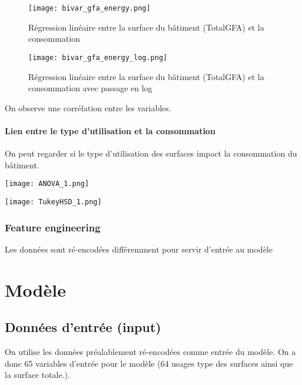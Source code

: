\begin{figure}[H]
  \texttt{[image: bivar\_gfa\_energy.png]}
  \caption{Régression linéaire entre la surface du bâtiment (TotalGFA) et la
  consommation}
  \label{}
\end{figure}

\begin{figure}[H]
  \texttt{[image: bivar\_gfa\_energy\_log.png]}
  \caption{Régression linéaire entre la surface du bâtiment (TotalGFA) et la
  consommation avec passage en log}
  \label{}
\end{figure}

On observe une corrélation entre les variables.



\paragraph{Lien entre le type d'utilisation et la consommation}
On peut regarder si le type d'utilisation des surfaces impact la consommation du bâtiment.
\begin{figure*}
  \texttt{[image: ANOVA\_1.png]}
  \caption{}
  \label{}
\end{figure*}
\begin{figure*}
  \texttt{[image: TukeyHSD\_1.png]}
  \caption{}
  \label{}
\end{figure*}




\subsubsection{Feature engineering}

Les données sont ré-encodées différemment pour servir d'entrée au modèle




\section{Modèle}


\subsection{Données d'entrée (input)}

On utilise les données préalablement ré-encodées comme entrée du modèle.
On a donc 65 variables d'entrée pour le modèle (64 usages type des surfaces ainsi
que la surface totale.).

